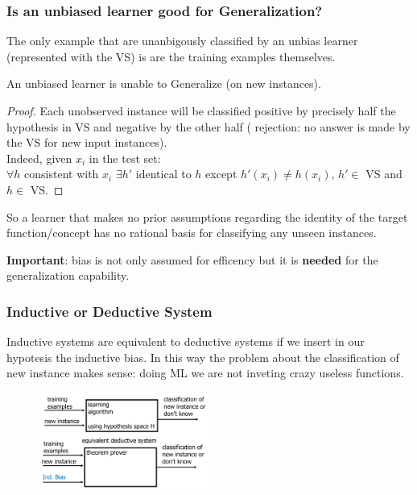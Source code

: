 \documentclass[../main.tex]{subfiles}
\begin{document}
\subsubsection{Is an unbiased learner good for Generalization?}%
The only example that are unanbigously classified by an unbias learner (represented with the VS) is are the training examples themselves.

\begin{theorem}
    An unbiased learner is unable to Generalize (on new instances).
\end{theorem}
\begin{proof}
    Each unobserved instance will be classified positive by precisely half the hypothesis in VS and negative by the other half ( rejection: no answer is made by the VS for new input instances).\\
    Indeed, given $x_i$ in the test set:\\
    $\forall h$ consistent with $x_i$ $\exists h'$ identical to $h$ except $h'(x_i) \neq h(x_i)$, $h' \in $ VS and $h \in $ VS.
\end{proof}
So a learner that makes no prior assumptions regarding the identity of the target function/concept has no rational basis for classifying any unseen instances.

\textbf{Important}: bias is not only assumed for efficency but it is \textbf{needed} for the generalization capability.

\subsubsection{Inductive or Deductive System}%
Inductive systems are equivalent to deductive systems if we insert in our hypotesis the inductive bias. In this way the problem about the classification of new instance makes sense: doing ML we are not inveting crazy useless functions.
\begin{figure}[H]
    \centering
    \includegraphics[width=0.5\textwidth]{lectures/1_Introduction/dedu_indu_sys.png}
\end{figure}
\end{document}
